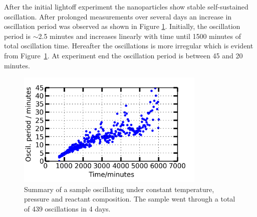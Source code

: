 \documentclass[8.5pt,twoside,twocolumn]{article}
\begin{document}
After the initial lightoff experiment the nanoparticles show stable self-sustained oscillation. After prolonged measurements over several days an increase in oscillation period was observed as shown in Figure \ref{fgr:long_measurement}. Initially, the oscillation period is $\sim$2.5 minutes and increases linearly with time until 1500 minutes of total oscillation time. Hereafter the oscillations is more irregular which is evident from Figure~\ref{fgr:long_measurement}. At experiment end the oscillation period is between 45 and 20 minutes.
\begin{figure}[h]
\centering
  \includegraphics[width=9cm]{summary_of_long_measurement.png}
  \caption{Summary of a sample oscillating under constant temperature, pressure and reactant composition. The sample went through a total of 439 oscillations in 4 days.}
  \label{fgr:long_measurement}
\end{figure}
  
\end{document}
